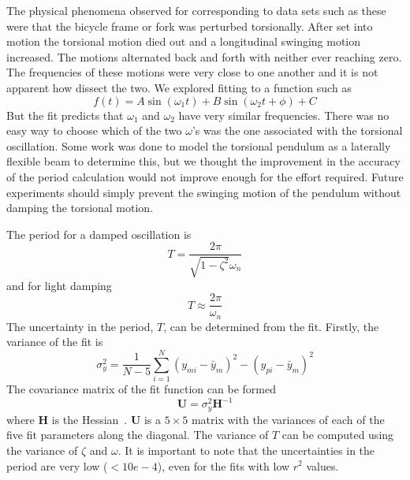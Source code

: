 \documentclass{bmd2010p}
\begin{document}
The physical phenomena observed for corresponding to data sets such as these were that
the bicycle frame or fork was perturbed torsionally. After set into motion the
torsional motion died out and a longitudinal swinging motion increased. The
motions alternated back and forth with neither ever reaching zero. The
frequencies of these motions were very close to one another and it is not
apparent how dissect the two. We explored fitting to a function such as
\begin{equation}
    f(t) = A\sin{(\omega_1 t)} + B\sin{(\omega_2 t + \phi)} + C
    \label{eqn:sumSines}
\end{equation}
But the fit predicts that $\omega_1$ and $\omega_2$ have very similar
frequencies. There was no easy way to choose which of the two $\omega$'s was
the one associated with the torsional oscillation. Some work was done to model
the torsional pendulum as a laterally flexible beam to determine this, but we
thought the improvement in the accuracy of the period calculation would not
improve enough for the effort required. Future experiments should simply
prevent the swinging motion of the pendulum without damping the torsional
motion.

The period for a damped oscillation is
\begin{equation}
    T = \frac{2\pi}{\sqrt{1-\zeta^2}\omega_n}
    \label{eqn:periodDamped}
\end{equation}
and for light damping
\begin{equation}
    T \approx \frac{2\pi}{\omega_n}
    \label{eqn:period}
\end{equation}
The uncertainty in the period, $T$, can be determined from the fit. Firstly,
the variance of the fit is
\begin{equation}
    \sigma_y^2 =
    \frac{1}{N-5}\sum_{i=1}^N(y_{mi}-\bar{y}_m)^2-(y_{pi}-\bar{y}_m)^2
    \label{eqn:fitVariance}
\end{equation}
The covariance matrix of the fit function can be formed
\begin{equation}
    \mathbf{U} = \sigma_y^2\mathbf{H}^{-1}
    \label{eqn:covariance}
\end{equation}
where $\mathbf{H}$ is the Hessian~\cite{Hubbard1989b}. $\mathbf{U}$ is a $5\times5$ matrix with the
variances of each of the five fit parameters along the diagonal.
The variance of $T$ can be computed using the variance of $\zeta$ and $\omega$. It
is important to note that the uncertainties in the period are very low
($<10e-4$), even for the fits with low $r^2$ values.
\end{document}
